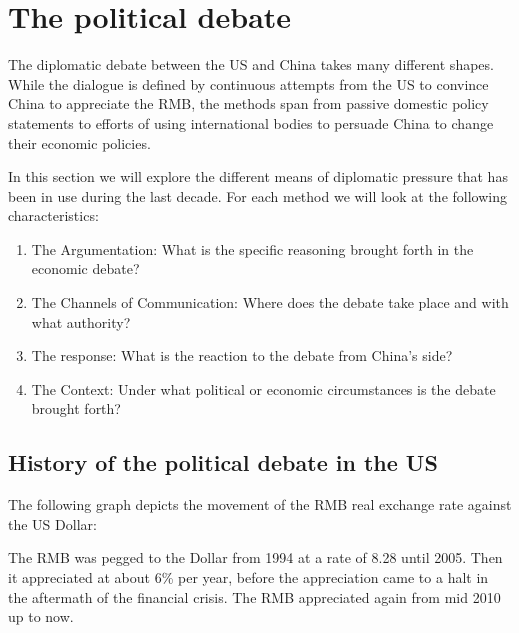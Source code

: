 
\section{The political debate}

The diplomatic debate between the US and China takes many different 
shapes. While the dialogue is defined by continuous attempts from the US 
to convince China to appreciate the RMB, the methods span from passive 
domestic policy statements to efforts of using international bodies to 
persuade China to change their economic policies.

In this section we will explore the different means of diplomatic 
pressure that has been in use during the last decade. For each method we 
will look at the following characteristics:

\begin{enumerate}
	\item{The Argumentation: What is the specific reasoning brought 
		forth in the economic debate?}
	\item{The Channels of Communication: Where does the debate take 
		place and with what authority?}
	\item{The response: What is the reaction to the debate from China's 
		side?}
	\item{The Context: Under what political or economic circumstances is 
		the debate brought forth?}
\end{enumerate}


\subsection{History of the political debate in the US}

The following graph depicts the movement of the RMB real exchange rate against the US Dollar:


The RMB was pegged to the Dollar from 1994 at a rate of 8.28 until 2005. Then it appreciated at about 6\% per year, before the appreciation came to a halt in the aftermath of the financial crisis. The RMB appreciated again from mid 2010 up to now.

